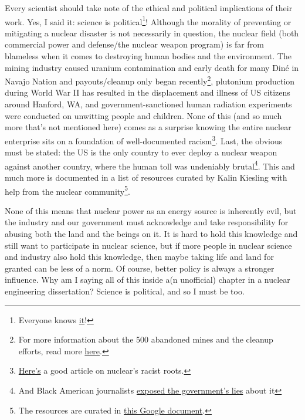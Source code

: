 {Every scientist should take note of the ethical and political implications of
their work. Yes, I said it: science is political\footnote[9]{Everyone knows
\href{https://www.scientificamerican.com/article/yes-science-is-political/}{\color{violet}it}!}!
Although the morality of preventing or mitigating a nuclear disaster is not
necessarily in question, the nuclear field (both commercial power and
defense/the nuclear weapon program) is far from blameless when it comes to
destroying human bodies and the environment. The mining industry caused uranium
contamination and early death for many Din\'{e} in Navajo Nation and
payouts/cleanup only began recently\footnote[10]{For more information about the
500 abandoned mines and the cleanup efforts, read more
\href{https://www.epa.gov/navajo-nation-uranium-cleanup/abandoned-mines-cleanup}{\color{violet}here}.},
plutonium production during World War II has resulted in the displacement and
illness of US citizens around Hanford, WA, and government-sanctioned human
radiation experiments were conducted on unwitting people and children. None of
this (and so much more that's not mentioned here) comes as a surprise knowing
the entire nuclear enterprise sits on a foundation of well-documented
racism\footnote[11]{\href{https://thebulletin.org/2020/08/a-call-for-antiracist-action-and-accountability-in-the-us-nuclear-community/}{\color{violet}Here's}
a good article on nuclear's racist roots.}.  Last, the obvious must be stated:
the US is the only country to ever deploy a nuclear weapon against another
country, where the human toll was undeniably brutal\footnote[12]{And Black
American journalists
\href{https://www.nytimes.com/2021/08/09/science/charles-loeb-atomic-bomb.html?smid=url-share
}{\color{violet}exposed the government's lies} about it}. This and much more is
documented in a list of resources curated by Kalin Kiesling with help from the
nuclear community\footnote[13]{The resources are curated in
\href{https://docs.google.com/document/d/e/2PACX-1vQuRSix5J31G4yhH-Z0kwmlpXe6OgS9MXg6l-LBEOVNDPDAPVivPSrJ7A71TMCsW2EdvGMepZCcwdTP/pub}{\color{violet}this
Google document}.}.

None of this means that nuclear power as an energy source is inherently evil,
but the industry and our government must acknowledge and take responsibility
for abusing both the land and the beings on it. It is hard to hold this
knowledge and still want to participate in nuclear science, but if more people
in nuclear science and industry also hold this knowledge, then maybe taking
life and land for granted can be less of a norm. Of course, better policy is
always a stronger influence. Why am I saying all of this inside a(n unofficial)
chapter in a nuclear engineering dissertation? Science is political, and so I
must be too.  

}
